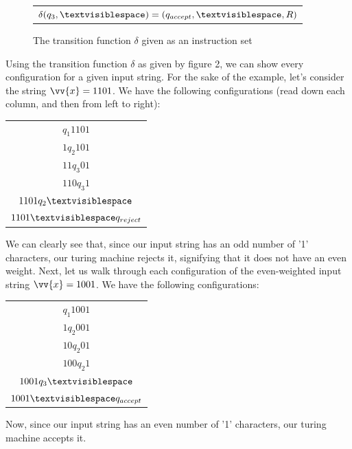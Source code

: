 \documentclass{article}
\begin{document}
\begin{exmp}
\begin{figure}[h]
\begin{tabular}{ c }
	$\delta(q_{3}, \textvisiblespace) = (q_{accept}, \textvisiblespace, R)$
	\end{tabular}
	\centering
	\caption{The transition function $\delta$ given as an instruction set}
\end{figure}
\noindent Using the transition function $\delta$ as given by figure 2, we can show every configuration for a given input string.  For the sake of the example, let's consider the string $\vv{x} = 1101$.  We have the following configurations (read down each column, and then from left to right):
\begin{center}
\begin{tabular}{ c }
	$q_{1}1101$ \\
	$1q_{2}101$ \\
	$11q_{3}01$ \\
	$110q_{3}1$ \\
	$1101q_{2} \textvisiblespace$ \\
	$1101 \textvisiblespace q_{reject}$
\end{tabular}
\end{center}
\noindent We can clearly see that, since our input string has an odd number of '1' characters, our turing machine rejects it, signifying that it does not have an even weight.  Next, let us walk through each configuration of the even-weighted input string $\vv{x} = 1001$.  We have the following configurations:
\begin{center}
\begin{tabular}{ c }
	$q_{1}1001$ \\
	$1q_{2}001$ \\
	$10q_{2}01$ \\
	$100q_{2}1$ \\
	$1001q_{3}\textvisiblespace$ \\
	$1001\textvisiblespace q_{accept}$
\end{tabular}
\end{center}
\end{exmp}
\noindent Now, since our input string has an even number of '1' characters, our turing machine accepts it. \cite{2}
\end{document}
